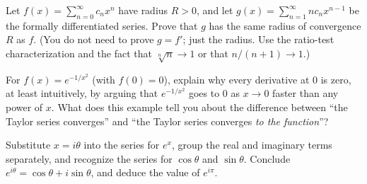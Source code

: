 \begin{exercise}
Let $f(x) = \sum_{n=0}^{\infty} c_n x^n$ have radius $R>0$, and let $g(x) = \sum_{n=1}^{\infty} n c_n x^{n-1}$ be the formally differentiated series. Prove that $g$ has the same radius of convergence $R$ as $f$. (You do not need to prove $g = f'$; just the radius. Use the ratio-test characterization and the fact that $\sqrt[n]{n}\to 1$ or that $n/(n+1)\to 1$.)
\end{exercise}

\begin{exercise}
For $f(x) = e^{-1/x^2}$ (with $f(0)=0$), explain why every derivative at $0$ is zero, at least intuitively, by arguing that $e^{-1/x^2}$ goes to $0$ as $x\to 0$ faster than any power of $x$. What does this example tell you about the difference between ``the Taylor series converges'' and ``the Taylor series converges \emph{to the function}''?
\end{exercise}

\begin{exercise}
Substitute $x = i\theta$ into the series for $e^x$, group the real and imaginary terms separately, and recognize the series for $\cos\theta$ and $\sin\theta$. Conclude $e^{i\theta} = \cos\theta + i\sin\theta$, and deduce the value of $e^{i\pi}$.
\end{exercise}
